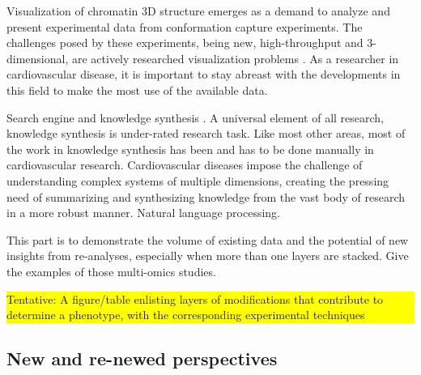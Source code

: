 \documentclass[letter]{bioinfo}
\newcommand{\todo}[1]{\colorbox{yellow}{\parbox{1\linewidth}{#1}}}
\begin{document}
Visualization of chromatin 3D structure emerges as a demand to analyze and present experimental data from conformation capture experiments. The challenges posed by these experiments, being new, high-throughput and  3-dimensional, are actively researched visualization problems \citep{Goodstadt:2017:Challenges}. As a researcher in cardiovascular disease, it is important to stay abreast with the developments in this field to make the most use of the available data.

Search engine and knowledge synthesis \citep{Lutjohann:2011:Sciencenet}. A universal element of all research, knowledge synthesis is under-rated research task. Like most other areas, most of the work in knowledge synthesis has been and has to be done manually in cardiovascular research. Cardiovascular diseases impose the challenge of understanding complex systems of multiple dimensions, creating the pressing need of summarizing and synthesizing knowledge from the vast body of research in a more robust manner. Natural language processing.


This part is to demonstrate the volume of existing data and the potential of new insights from re-analyses, especially when more than one layers are stacked. Give the examples of those multi-omics studies.


\todo{Tentative: A figure/table enlisting layers of modifications that contribute to determine a phenotype, with the corresponding experimental techniques}

\cite{Santolini:2018:personalized} 

\cite{Klarin:2017:Genetic}


%
%

\subsection{New and re-newed perspectives}
\end{document}
